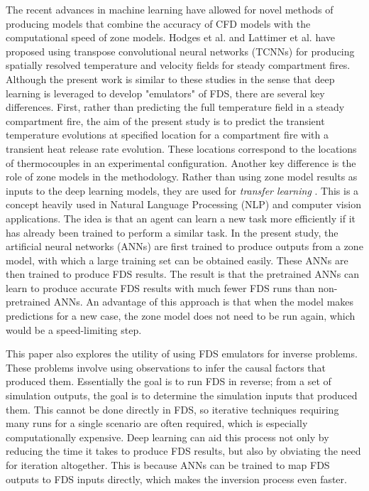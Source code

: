 \documentclass{article}
\begin{document}
The recent advances in machine learning have allowed for novel methods of producing models that combine the accuracy of CFD models with the computational speed of zone models. Hodges et al. \cite{hodges2019compartment} and  Lattimer et al. \cite{lattimer2020using} have proposed using transpose convolutional neural networks (TCNNs) for producing spatially resolved temperature and velocity fields for steady compartment fires. Although the present work is similar to these studies in the sense that deep learning is leveraged to develop "emulators" of FDS, there are several key differences. First, rather than predicting the full temperature field in a steady compartment fire, the aim of the present study is to predict the transient temperature evolutions at specified location for a compartment fire with a transient heat release rate evolution. These locations correspond to the locations of thermocouples in an experimental configuration. Another key difference is the role of zone models in the methodology. Rather than using zone model results as inputs to the deep learning models, they are used for \textit{transfer learning} \cite{pan2009survey}. This is a concept heavily used in Natural Language Processing (NLP) \cite{ruder2019transfer} and computer vision \cite{gopalakrishnan2017deep} applications. The idea is that an agent can learn a new task more efficiently if it has already been trained to perform a similar task. In the present study, the artificial neural networks (ANNs) are first trained to produce outputs from a zone model, with which a large training set can be obtained easily. These ANNs are then trained to produce FDS results. The result is that the pretrained ANNs can learn to produce accurate FDS results with much fewer FDS runs than non-pretrained ANNs. An advantage of this approach is that when the model makes predictions for a new case, the zone model does not need to be run again, which would be a speed-limiting step. 

This paper also explores the utility of using FDS emulators for inverse problems. These problems involve using observations to infer the causal factors that produced them. Essentially the goal is to run FDS in reverse; from a set of simulation outputs, the goal is to determine the simulation inputs that produced them. This cannot be done directly in FDS, so iterative techniques requiring many runs for a single scenario are often required, which is especially computationally expensive. Deep learning can aid this process not only by reducing the time it takes to produce FDS results, but also by obviating the need for iteration altogether. This is because ANNs can be trained to map FDS outputs to FDS inputs directly, which makes the inversion process even faster. 
\end{document}
